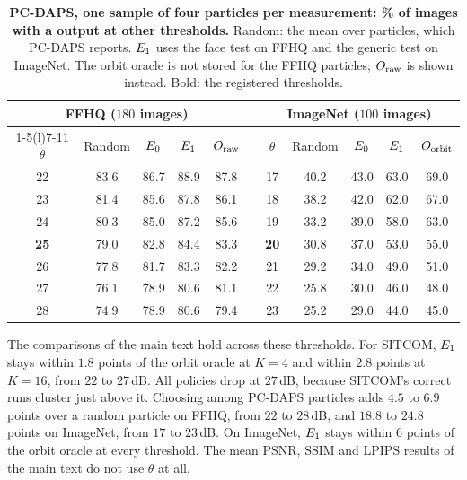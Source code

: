 \begin{table}[h]
\centering\small
\setlength{\tabcolsep}{3.5pt}
\begin{tabular}{@{}c cccc c c cccc@{}}
\toprule
\multicolumn{5}{c}{FFHQ ($180$ images)} & & \multicolumn{5}{c}{ImageNet ($100$ images)} \\
\cmidrule(r){1-5}\cmidrule(l){7-11}
$\theta$ & Random & $E_0$ & $E_1$ & $O_{\mathrm{raw}}$ & & $\theta$ & Random & $E_0$ & $E_1$ & $O_{\mathrm{orbit}}$ \\
\midrule
22 & 83.6 & 86.7 & 88.9 & 87.8 & & 17 & 40.2 & 43.0 & 63.0 & 69.0 \\
23 & 81.4 & 85.6 & 87.8 & 86.1 & & 18 & 38.2 & 42.0 & 62.0 & 67.0 \\
24 & 80.3 & 85.0 & 87.2 & 85.6 & & 19 & 33.2 & 39.0 & 58.0 & 63.0 \\
\textbf{25} & 79.0 & 82.8 & 84.4 & 83.3 & & \textbf{20} & 30.8 & 37.0 & 53.0 & 55.0 \\
26 & 77.8 & 81.7 & 83.3 & 82.2 & & 21 & 29.2 & 34.0 & 49.0 & 51.0 \\
27 & 76.1 & 78.9 & 80.6 & 81.1 & & 22 & 25.8 & 30.0 & 46.0 & 48.0 \\
28 & 74.9 & 78.9 & 80.6 & 79.4 & & 23 & 25.2 & 29.0 & 44.0 & 45.0 \\
\bottomrule
\end{tabular}
\caption{\textbf{PC-DAPS, one sample of four particles per measurement: \% of images with a \good output at other thresholds.} Random: the mean over particles, which PC-DAPS reports. $E_1$ uses the face test on FFHQ and the generic test on ImageNet. The orbit oracle is not stored for the FFHQ particles; $O_{\mathrm{raw}}$ is shown instead. Bold: the registered thresholds.}
\label{tab:suppl-theta-pcdaps}
\end{table}

The comparisons of the main text hold across these thresholds.
For SITCOM, $E_1$ stays within $1.8$ points of the orbit oracle at $K=4$ and within $2.8$ points at $K=16$, from $22$ to $27$\,dB.
All policies drop at $27$\,dB, because SITCOM's correct runs cluster just above it.
Choosing among PC-DAPS particles adds $4.5$ to $6.9$ points over a random particle on FFHQ, from $22$ to $28$\,dB, and $18.8$ to $24.8$ points on ImageNet, from $17$ to $23$\,dB.
On ImageNet, $E_1$ stays within $6$ points of the orbit oracle at every threshold.
The mean PSNR, SSIM and LPIPS results of the main text do not use $\theta$ at all.

